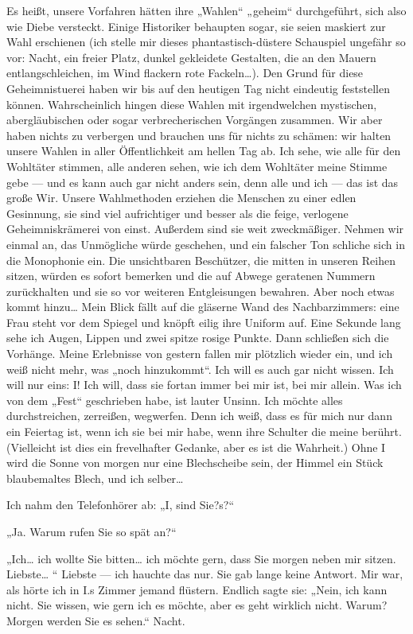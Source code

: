 Es heißt, unsere Vorfahren hätten ihre „Wahlen“ „geheim“
durchgeführt, sich also wie Diebe versteckt. Einige Historiker
behaupten sogar, sie seien maskiert zur Wahl erschienen (ich stelle
mir dieses phantastisch-düstere Schauspiel ungefähr so vor: Nacht,
ein freier Platz, dunkel gekleidete Gestalten, die an den Mauern
entlangschleichen, im Wind flackern rote Fackeln\ldots{}). Den Grund für
diese Geheimnistuerei haben wir bis auf den heutigen Tag nicht
eindeutig feststellen können. Wahrscheinlich hingen diese Wahlen
mit irgendwelchen mystischen, abergläubischen oder sogar
verbrecherischen Vorgängen zusammen. Wir aber haben nichts zu
verbergen und brauchen uns für nichts zu schämen: wir halten unsere
Wahlen in aller Öffentlichkeit am hellen Tag ab. Ich sehe, wie alle
für den Wohltäter stimmen, alle anderen sehen, wie ich dem
Wohltäter meine Stimme gebe — und es kann auch gar nicht anders
sein, denn alle und ich — das ist das große Wir. Unsere
Wahlmethoden erziehen die Menschen zu einer edlen Gesinnung, sie
sind viel aufrichtiger und besser als die feige, verlogene
Geheimniskrämerei von einst. Außerdem sind sie weit zweckmäßiger.
Nehmen wir einmal an, das Unmögliche würde geschehen, und ein
falscher Ton schliche sich in die Monophonie ein. Die unsichtbaren
Beschützer, die mitten in unseren Reihen sitzen, würden
es sofort bemerken und die auf Abwege geratenen Nummern
zurückhalten und sie so vor weiteren Entgleisungen bewahren. Aber
noch etwas kommt hinzu\ldots{} Mein Blick fällt auf die gläserne Wand
des Nachbarzimmers: eine Frau steht vor dem Spiegel und knöpft
eilig ihre Uniform auf. Eine Sekunde lang sehe ich Augen, Lippen
und zwei spitze rosige Punkte. Dann schließen sich die Vorhänge.
Meine Erlebnisse von gestern fallen mir plötzlich wieder ein, und
ich weiß nicht mehr, was „noch hinzukommt“. Ich will es auch gar
nicht wissen. Ich will nur eins: I! Ich will, dass sie fortan immer
bei mir ist, bei mir allein. Was ich von dem „Fest“ geschrieben
habe, ist lauter Unsinn. Ich möchte alles durchstreichen,
zerreißen, wegwerfen. Denn ich weiß, dass es für mich nur dann ein
Feiertag ist, wenn ich sie bei mir habe, wenn ihre Schulter die
meine berührt. (Vielleicht ist dies ein frevelhafter Gedanke, aber
es ist die Wahrheit.) Ohne I wird die Sonne von morgen nur eine
Blechscheibe sein, der Himmel ein Stück blaubemaltes Blech, und ich
selber\ldots{}

Ich nahm den Telefonhörer ab: „I, sind Sie?s?“

„Ja. Warum rufen Sie so spät an?“

„Ich\ldots{} ich wollte Sie bitten\ldots{} ich möchte gern, dass Sie morgen
neben mir sitzen. Liebste\ldots{} “ Liebste — ich hauchte das nur. Sie
gab lange keine Antwort. Mir war, als hörte ich in I.s Zimmer
jemand flüstern. Endlich sagte sie: „Nein, ich kann nicht. Sie
wissen, wie gern ich es möchte, aber es geht wirklich nicht. Warum?
Morgen werden Sie es sehen.“ Nacht.

